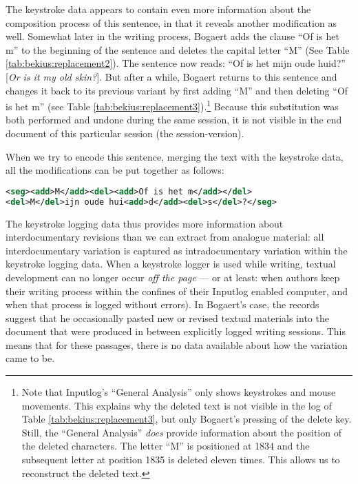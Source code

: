\begin{paper}
\noindent The keystroke data appears to contain even more information about the
composition process of this sentence, in that it reveals another
modification as well. Somewhat later in the writing process, Bogaert
adds the clause ``Of is het m'' to the beginning of the sentence and
deletes the capital letter ``M'' (See Table \ref{tab:bekius:replacement2}). The sentence now reads: ``Of
is het mijn oude huid?'' [\emph{Or is it my old skin?}]. But after a while,
Bogaert returns to this sentence and changes it back to its previous
variant by first adding ``M'' and then deleting ``Of is het m'' (see Table \ref{tab:bekius:replacement3}).\footnote{Note that Inputlog's ``General Analysis'' only shows
  keystrokes and mouse movements. This explains why the deleted text is
  not visible in the log of Table \ref{tab:bekius:replacement3}, but only Bogaert's pressing of the
  delete key. Still, the ``General Analysis'' \emph{does} provide
  information about the position of the deleted characters. The letter
  ``M'' is positioned at 1834 and the subsequent letter at position 1835
  is deleted eleven times. This allows us to reconstruct the deleted
  text.} Because this substitution was both performed and undone during
the same session, it is not visible in the end document of this
particular session (the session-version).
\newpage

When we try to encode this sentence, merging the text with the keystroke
data, all the modifications can be put together as follows:
\begin{example}
\label{ex:bekius:1}
\begin{lstlisting}[language=XML]
<seg><add>M</add><del><add>Of is het m</add></del>
<del>M</del>ijn oude hui<add>d</add><del>s</del>?</seg>
\end{lstlisting}
\end{example}

\noindent The keystroke logging data thus provides more information about
interdocumentary revisions than we can extract from analogue material:
all interdocumentary variation is captured as intradocumentary variation
within the keystroke logging data. When a keystroke logger is used while
writing, textual development can no longer occur \emph{off the page} ---
or at least: when authors keep their writing process within the
confines of their Inputlog enabled computer, and when that process is
logged without errors). In Bogaert's case, the records suggest that he
occasionally pasted new or revised textual materials into the document
that were produced in between explicitly logged writing sessions. This means that for these passages, there is no data available about how the variation came to be.


\end{paper}

